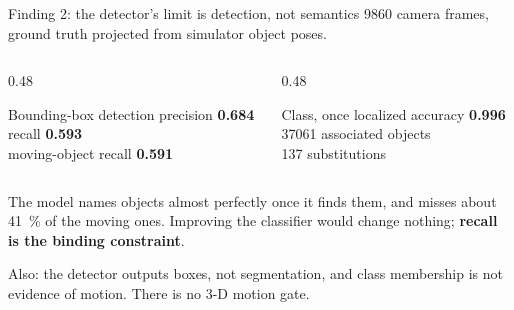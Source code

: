 \documentclass[aspectratio=169,11pt]{beamer}
\begin{document}
\begin{frame}{Finding 2: the detector's limit is detection, not semantics}
  \SI{9860}{} camera frames, ground truth projected from simulator object poses.

  \vspace{0.8em}
  \begin{columns}[T]
    \begin{column}{0.48\textwidth}
      \begin{block}{Bounding-box detection}
        precision \textbf{0.684}\\
        recall \textbf{0.593}\\
        moving-object recall \textbf{0.591}
      \end{block}
    \end{column}
    \begin{column}{0.48\textwidth}
      \begin{block}{Class, once localized}
        accuracy \textbf{0.996}\\
        \SI{37061}{} associated objects\\
        137 substitutions
      \end{block}
    \end{column}
  \end{columns}

  \vspace{0.8em}
  The model names objects almost perfectly once it finds them, and misses about
  \SI{41}{\percent} of the moving ones. Improving the classifier would change
  nothing; \textbf{recall is the binding constraint}.

  \vspace{0.5em}
  \footnotesize Also: the detector outputs boxes, not segmentation, and class
  membership is not evidence of motion. There is no 3-D motion gate.
\end{frame}
\end{document}
